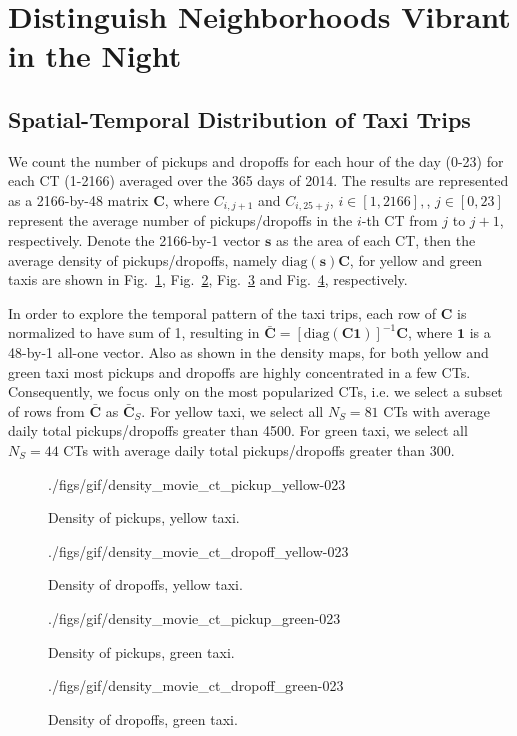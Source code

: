 \documentclass[journal]{IEEEtran}
\begin{document}
\section{Distinguish Neighborhoods Vibrant in the Night}
\label{sec:distribution}
\subsection{Spatial-Temporal Distribution of Taxi Trips}
We count the number of pickups and dropoffs for each hour of the day (0-23) for
each CT (1-2166) averaged over the 365 days of 2014. The results are represented
as a 2166-by-48 matrix $\mathbf{C}$, where $C_{i,j+1}$ and $C_{i,25+j}$,
$i\in[1, 2166],$, $j\in[0,23]$ represent the average number of pickups/dropoffs in
the $i$-th CT from $j$ to $j+1$, respectively. Denote the 2166-by-1 vector
$\mathbf{s}$ as the area of each CT, then the average density of
pickups/dropoffs, namely $\mbox{diag}(\mathbf{s})\mathbf{C}$, for yellow and
green taxis are shown in Fig.~\ref{fig:density_pickup_yellow},
Fig.~\ref{fig:density_dropoff_yellow}, Fig.~\ref{fig:density_pickup_green} and
Fig.~\ref{fig:density_dropoff_green}, respectively.

In order to explore the temporal pattern of the taxi trips, each row of
$\mathbf{C}$ is normalized to have sum of 1, resulting in $\bar{\mathbf{C}} =
[\mbox{diag}(\mathbf{C1})]^{-1}\mathbf{C}$, where $\mathbf{1}$ is a 48-by-1
all-one vector. Also as shown in the density maps, for both
yellow and green taxi most pickups and dropoffs are highly concentrated in a
few CTs. Consequently, we focus only on the most popularized CTs, i.e. we select
a subset of rows from $\bar{\mathbf{C}}$ as $\bar{\mathbf{C}}_S$. For yellow
taxi, we select all $N_S = 81$ CTs with average daily total pickups/dropoffs
greater than 4500. For green taxi, we select all $N_S = 44$ CTs with average
daily total pickups/dropoffs greater than 300.

\begin{figure}[!t] 
  \centering
  {./figs/gif/density_movie_ct_pickup_yellow-}{0}{23}
  \caption{Density of pickups, yellow taxi.}
  \label{fig:density_pickup_yellow}
\end{figure}
\begin{figure}[!t] 
  \centering
  {./figs/gif/density_movie_ct_dropoff_yellow-}{0}{23}
  \caption{Density of dropoffs, yellow taxi.}
  \label{fig:density_dropoff_yellow}
\end{figure}
\begin{figure}[!t] 
  \centering
  {./figs/gif/density_movie_ct_pickup_green-}{0}{23}
  \caption{Density of pickups, green taxi.}
  \label{fig:density_pickup_green}
\end{figure}
\begin{figure}[!t] 
  \centering
  {./figs/gif/density_movie_ct_dropoff_green-}{0}{23}
  \caption{Density of dropoffs, green taxi.}
  \label{fig:density_dropoff_green}
\end{figure}
\end{document}
